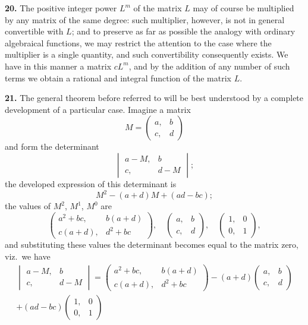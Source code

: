 \documentclass[11pt,a4paper]{book}
\begin{document}
\begin{center}
\medskip
\noindent\textbf{20.} The positive integer power $L^m$ of the matrix $L$ may of course be multiplied by any matrix of the same degree: such multiplier, however, is not in general convertible with $L$; and to preserve as far as possible the analogy with ordinary algebraical functions, we may restrict the attention to the case where the multiplier is a single quantity, and such convertibility consequently exists. We have in this manner a matrix $cL^m$, and by the addition of any number of such terms we obtain a rational and integral function of the matrix $L$.

\medskip
\noindent\textbf{21.} The general theorem before referred to will be best understood by a complete development of a particular case. Imagine a matrix
\[
M = \begin{pmatrix} a, & b \\ c, & d \end{pmatrix}
\]
and form the determinant
\[
\begin{vmatrix} a-M, & b \\ c, & d-M \end{vmatrix};
\]
the developed expression of this determinant is
\[M^2 - (a+d)M + (ad-bc);\]
the values of $M^2$, $M^1$, $M^0$ are
\[
\begin{pmatrix} a^2+bc, & b(a+d) \\ c(a+d), & d^2+bc \end{pmatrix},\quad
\begin{pmatrix} a, & b \\ c, & d \end{pmatrix},\quad
\begin{pmatrix} 1, & 0 \\ 0, & 1 \end{pmatrix},
\]
and substituting these values the determinant becomes equal to the matrix zero, viz.\ we have
\begin{multline*}
\begin{vmatrix} a-M, & b \\ c, & d-M \end{vmatrix}
= \begin{pmatrix} a^2+bc, & b(a+d) \\ c(a+d), & d^2+bc \end{pmatrix}
- (a+d)\begin{pmatrix} a, & b \\ c, & d \end{pmatrix} \\
+ (ad-bc)\begin{pmatrix} 1, & 0 \\ 0, & 1 \end{pmatrix}

\end{multline*}
\end{center}
\end{document}
